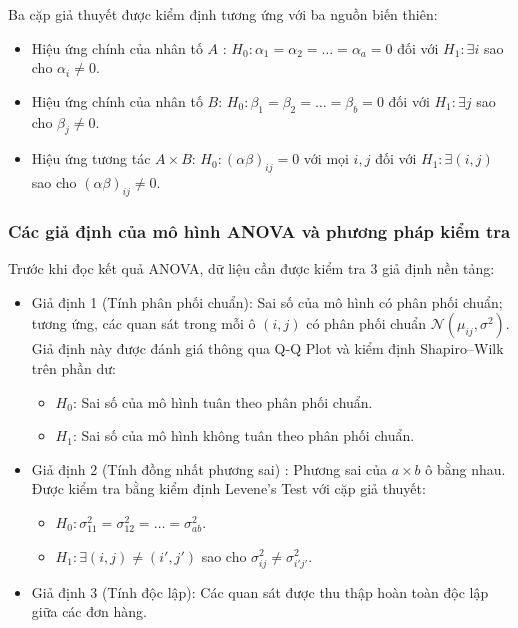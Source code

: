 	Ba cặp giả thuyết được kiểm định tương ứng với ba nguồn biến thiên:
	\begin{itemize}
		\item Hiệu ứng chính của nhân tố $A$ : $H_0: \alpha_1 = \alpha_2 = \dots = \alpha_a = 0$ đối với $H_1: \exists i$ sao cho $\alpha_i \neq 0$.
		\item Hiệu ứng chính của nhân tố $B$: $H_0: \beta_1 = \beta_2 = \dots = \beta_b = 0$ đối với $H_1: \exists j$ sao cho $\beta_j \neq 0$.
		\item Hiệu ứng tương tác $A \times B$: $H_0: (\alpha\beta)_{ij} = 0$ với mọi $i, j$ đối với $H_1: \exists (i, j)$ sao cho $(\alpha\beta)_{ij} \neq 0$.
	\end{itemize}
	
	\subsubsection{Các giả định của mô hình ANOVA và phương pháp kiểm tra}
	
	Trước khi đọc kết quả ANOVA, dữ liệu cần được kiểm tra 3 giả định nền tảng:
	\begin{itemize}
		\item Giả định 1 (Tính phân phối chuẩn): Sai số của mô hình có phân phối chuẩn; tương ứng, các quan sát trong mỗi ô $(i, j)$ có phân phối chuẩn $\mathcal{N}(\mu_{ij}, \sigma^2)$. Giả định này được đánh giá thông qua Q-Q Plot và kiểm định Shapiro–Wilk trên phần dư:
		\begin{itemize}[label={$+$}, leftmargin=*]
			\item $H_0$: Sai số của mô hình tuân theo phân phối chuẩn.
			\item $H_1$: Sai số của mô hình không tuân theo phân phối chuẩn.
		\end{itemize}
		\item Giả định 2 (Tính đồng nhất phương sai) : Phương sai của $a \times b$ ô bằng nhau. Được kiểm tra bằng kiểm định Levene's Test với cặp giả thuyết:
		\begin{itemize}
			\item $H_0: \sigma_{11}^2 = \sigma_{12}^2 = \dots = \sigma_{ab}^2$.
			\item $H_1: \exists (i, j) \neq (i', j')$ sao cho $\sigma_{ij}^2 \neq \sigma_{i'j'}^2$.
		\end{itemize}
		\item Giả định 3 (Tính độc lập): Các quan sát được thu thập hoàn toàn độc lập giữa các đơn hàng.
	\end{itemize}
	
